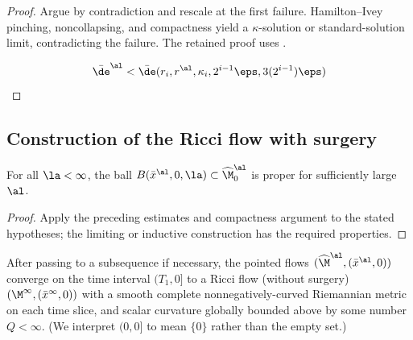 \begin{proof}
\sketch Argue by contradiction and rescale at the first failure. Hamilton--Ivey pinching, noncollapsing, and compactness yield a $\kappa$-solution or standard-solution limit, contradicting the failure.
The retained proof uses \cite[Corollary 7.7]{Chow-Knopf}.

\begin{equation}
\label{F_1condition}
\bar\de^{\al}<\bar\de(r_i,r^\al,\kappa_i,2^{i-1}\eps,3(2^{i-1})\eps)
\end{equation}
\end{proof}

\subsection{Construction of the Ricci flow with surgery}  \label{surgeryflow}

\begin{lemma}
  \label{lem:kl-construction-ricci-flow-surgery-ricci-flow-surgery-lemma}

For all $\la<\infty$,
the ball $B(\bar x^\al,0,\la)\subset\widehat\M^\al_0$
is proper for sufficiently
large $\al$.
\end{lemma}

\begin{proof}
\sketch Apply the preceding estimates and compactness argument to the stated hypotheses; the limiting or inductive construction has the required properties.
\end{proof}

\begin{lemma}
  \label{lem:kl-construction-ricci-flow-surgery-convergence-ricci-flow-surgery}
 \label{bdrysmoothness}
After passing to a subsequence
if necessary, the pointed flows  $(\widehat\M^\al,(\bar x^\al,0))$
converge on the time interval $(T_1, 0]$ to a Ricci flow (without
surgery) $(\M^\infty,(\bar x^\infty,0))$ with
a smooth complete nonnegatively-curved Riemannian metric
on each time slice, and
scalar curvature globally bounded above by
some number $Q<\infty$.
(We interpret $(0, 0]$ to mean $\{0\}$ rather than the
empty set.)
\end{lemma}

